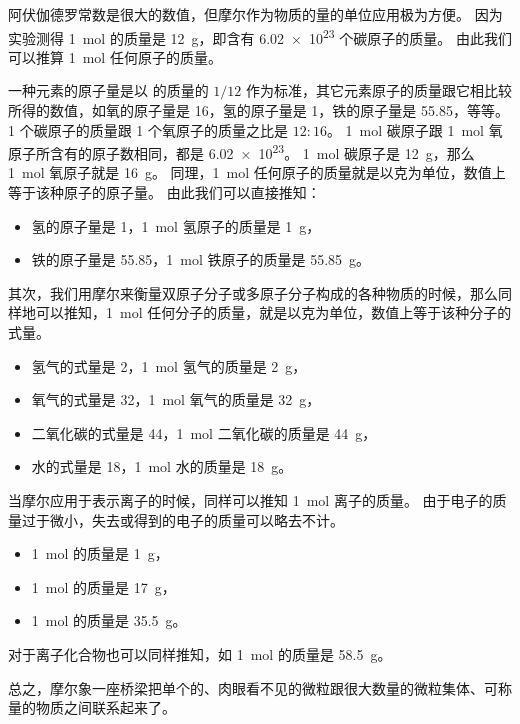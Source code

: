 阿伏伽德罗常数是很大的数值，但摩尔作为物质的量的单位应用极为方便。
因为实验测得 \qty{1}{mol}  的质量是 \qty{12}{g}，即含有 \num{6.02e23} 个碳原子的质量。
由此我们可以推算 \qty{1}{mol} 任何原子的质量。

一种元素的原子量是以  的质量的 $1/12$ 作为标准，其它元素原子的质量跟它相比较所得的数值，如氧的原子量是 16，氢的原子量是 1，铁的原子量是 55.85，等等。
1 个碳原子的质量跟 1 个氧原子的质量之比是 $12:16$。
\qty{1}{mol} 碳原子跟 \qty{1}{mol} 氧原子所含有的原子数相同，都是 \num{6.02e23}。
\qty{1}{mol} 碳原子是 \qty{12}{g}，那么 \qty{1}{mol} 氧原子就是 \qty{16}{g}。
同理，\qty{1}{mol} 任何原子的质量就是以克为单位，数值上等于该种原子的原子量。
由此我们可以直接推知：
\begin{itemize}[label={},labelsep=0pt]
  \item 氢的原子量是 1，\qty{1}{mol} 氢原子的质量是 \qty{1}{g}，
  \item 铁的原子量是 55.85，\qty{1}{mol} 铁原子的质量是 \qty{55.85}{g}。
\end{itemize}

其次，我们用摩尔来衡量双原子分子或多原子分子构成的各种物质的时候，那么同样地可以推知，\qty{1}{mol} 任何分子的质量，就是以克为单位，数值上等于该种分子的式量。
\begin{itemize}[label={},labelsep=0pt]
  \item 氢气的式量是 2，\qty{1}{mol} 氢气的质量是 \qty{2}{g}，
  \item 氧气的式量是 32，\qty{1}{mol} 氧气的质量是 \qty{32}{g}，
  \item 二氧化碳的式量是 44，\qty{1}{mol} 二氧化碳的质量是 \qty{44}{g}，
  \item 水的式量是 18，\qty{1}{mol} 水的质量是 \qty{18}{g}。
\end{itemize}

当摩尔应用于表示离子的时候，同样可以推知 \qty{1}{mol} 离子的质量。
由于电子的质量过于微小，失去或得到的电子的质量可以略去不计。
\begin{itemize}[label={},labelsep=0pt]
  \item \qty{1}{mol}  的质量是 \qty{1}{g}，
  \item \qty{1}{mol}  的质量是 \qty{17}{g}，
  \item \qty{1}{mol}  的质量是 \qty{35.5}{g}。
\end{itemize}

对于离子化合物也可以同样推知，如 \qty{1}{mol}  的质量是 \qty{58.5}{g}。

总之，摩尔象一座桥梁把单个的、肉眼看不见的微粒跟很大数量的微粒集体、可称量的物质之间联系起来了。

